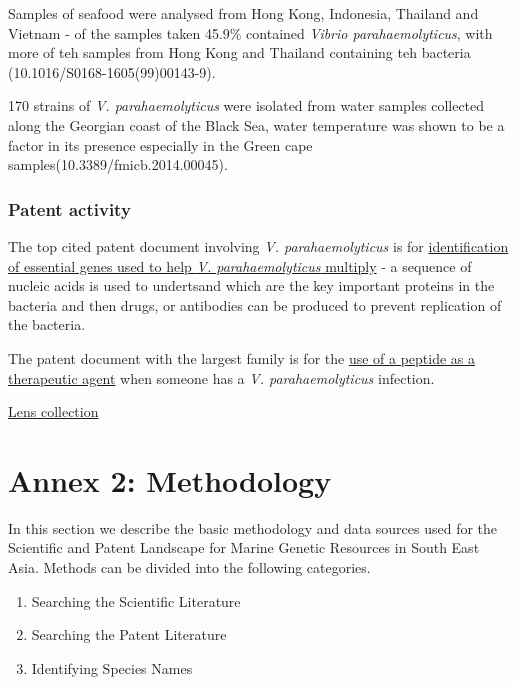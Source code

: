 \documentclass[]{book}
\providecommand{\tightlist}{%
  \setlength{\itemsep}{0pt}\setlength{\parskip}{0pt}}
\theoremstyle{definition}
\theoremstyle{definition}
\theoremstyle{definition}
\theoremstyle{remark}
\begin{document}
Samples of seafood were analysed from Hong Kong, Indonesia, Thailand and
Vietnam - of the samples taken 45.9\% contained \emph{Vibrio
parahaemolyticus}, with more of teh samples from Hong Kong and Thailand
containing teh bacteria (10.1016/S0168-1605(99)00143-9).

170 strains of \emph{V. parahaemolyticus} were isolated from water
samples collected along the Georgian coast of the Black Sea, water
temperature was shown to be a factor in its presence especially in the
Green cape samples(10.3389/fmicb.2014.00045).

\hypertarget{patent-activity-9}{%
\subsection{Patent activity}\label{patent-activity-9}}

The top cited patent document involving \emph{V. parahaemolyticus} is
for
\href{https://www.lens.org/lens/patent/US_2004_0029129_A1}{identification
of essential genes used to help \emph{V. parahaemolyticus} multiply} - a
sequence of nucleic acids is used to undertsand which are the key
important proteins in the bacteria and then drugs, or antibodies can be
produced to prevent replication of the bacteria.

The patent document with the largest family is for the
\href{https://www.lens.org/lens/patent/WO_2009_043477_A2}{use of a
peptide as a therapeutic agent} when someone has a \emph{V.
parahaemolyticus} infection.

\href{https://www.lens.org/lens/collection/24760}{Lens collection}

\hypertarget{method}{%
\chapter{Annex 2: Methodology}\label{method}}

In this section we describe the basic methodology and data sources used
for the Scientific and Patent Landscape for Marine Genetic Resources in
South East Asia. Methods can be divided into the following categories.

\begin{enumerate}
\def\labelenumi{\arabic{enumi}.}
\tightlist
\item
  Searching the Scientific Literature
\item
  Searching the Patent Literature
\item
  Identifying Species Names
\end{enumerate}
\end{document}
